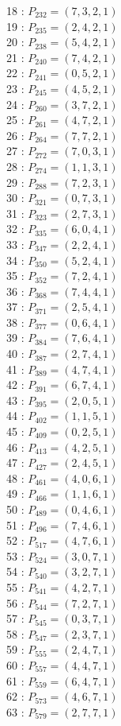 \documentclass{article}
\begin{document}
{\begin{multicols}{2}
18 : $P_{232}=( 7, 3, 2, 1 )$\\
19 : $P_{235}=( 2, 4, 2, 1 )$\\
20 : $P_{238}=( 5, 4, 2, 1 )$\\
21 : $P_{240}=( 7, 4, 2, 1 )$\\
22 : $P_{241}=( 0, 5, 2, 1 )$\\
23 : $P_{245}=( 4, 5, 2, 1 )$\\
24 : $P_{260}=( 3, 7, 2, 1 )$\\
25 : $P_{261}=( 4, 7, 2, 1 )$\\
26 : $P_{264}=( 7, 7, 2, 1 )$\\
27 : $P_{272}=( 7, 0, 3, 1 )$\\
28 : $P_{274}=( 1, 1, 3, 1 )$\\
29 : $P_{288}=( 7, 2, 3, 1 )$\\
30 : $P_{321}=( 0, 7, 3, 1 )$\\
31 : $P_{323}=( 2, 7, 3, 1 )$\\
32 : $P_{335}=( 6, 0, 4, 1 )$\\
33 : $P_{347}=( 2, 2, 4, 1 )$\\
34 : $P_{350}=( 5, 2, 4, 1 )$\\
35 : $P_{352}=( 7, 2, 4, 1 )$\\
36 : $P_{368}=( 7, 4, 4, 1 )$\\
37 : $P_{371}=( 2, 5, 4, 1 )$\\
38 : $P_{377}=( 0, 6, 4, 1 )$\\
39 : $P_{384}=( 7, 6, 4, 1 )$\\
40 : $P_{387}=( 2, 7, 4, 1 )$\\
41 : $P_{389}=( 4, 7, 4, 1 )$\\
42 : $P_{391}=( 6, 7, 4, 1 )$\\
43 : $P_{395}=( 2, 0, 5, 1 )$\\
44 : $P_{402}=( 1, 1, 5, 1 )$\\
45 : $P_{409}=( 0, 2, 5, 1 )$\\
46 : $P_{413}=( 4, 2, 5, 1 )$\\
47 : $P_{427}=( 2, 4, 5, 1 )$\\
48 : $P_{461}=( 4, 0, 6, 1 )$\\
49 : $P_{466}=( 1, 1, 6, 1 )$\\
50 : $P_{489}=( 0, 4, 6, 1 )$\\
51 : $P_{496}=( 7, 4, 6, 1 )$\\
52 : $P_{517}=( 4, 7, 6, 1 )$\\
53 : $P_{524}=( 3, 0, 7, 1 )$\\
54 : $P_{540}=( 3, 2, 7, 1 )$\\
55 : $P_{541}=( 4, 2, 7, 1 )$\\
56 : $P_{544}=( 7, 2, 7, 1 )$\\
57 : $P_{545}=( 0, 3, 7, 1 )$\\
58 : $P_{547}=( 2, 3, 7, 1 )$\\
59 : $P_{555}=( 2, 4, 7, 1 )$\\
60 : $P_{557}=( 4, 4, 7, 1 )$\\
61 : $P_{559}=( 6, 4, 7, 1 )$\\
62 : $P_{573}=( 4, 6, 7, 1 )$\\
63 : $P_{579}=( 2, 7, 7, 1 )$\\
\end{multicols}
}
\end{document}
